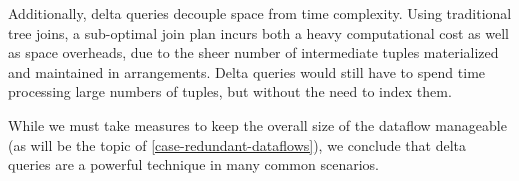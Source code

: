 \documentclass[../catalog.tex]{subfiles}
\begin{document}
Additionally, delta queries decouple space from time complexity. Using
traditional tree joins, a sub-optimal join plan incurs both a heavy
computational cost as well as space overheads, due to the sheer number
of intermediate tuples materialized and maintained in
arrangements. Delta queries would still have to spend time processing
large numbers of tuples, but without the need to index them.

While we must take measures to keep the overall size of the dataflow
manageable (as will be the topic of
\autoref{case-redundant-dataflows}), we conclude that delta queries
are a powerful technique in many common scenarios.
\end{document}
